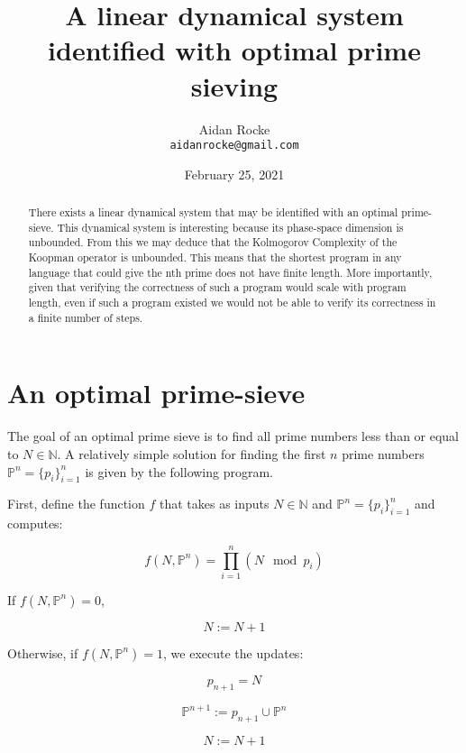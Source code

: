 \documentclass{article}
\title{A linear dynamical system identified with optimal prime sieving}
\date{February 25, 2021}
\author{%
  Aidan Rocke\\
  \texttt{aidanrocke@gmail.com} \\
}
\begin{document}
\maketitle

\begin{abstract}
There exists a linear dynamical system that may be identified with an optimal prime-sieve. This
dynamical system is interesting because its phase-space dimension is unbounded. From this we may deduce that the
Kolmogorov Complexity of the Koopman operator is unbounded. This means that the shortest program in any language
that could give the nth prime does not have finite length. More importantly, given that verifying the correctness of such a program would scale with program length, even if such a program existed we would not be able to verify its correctness in a finite number of steps.
	
\end{abstract}

\section{An optimal prime-sieve}

The goal of an optimal prime sieve is to find all prime numbers less than or equal to $N \in \mathbb{N}$.
A relatively simple solution for finding the first $n$ prime numbers $\mathbb{P}^n = \{p_i\}_{i=1}^n$
is given by the following program.

First, define the function $f$ that takes as inputs $N \in \mathbb{N}$ and $\mathbb{P}^n = \{p_i\}_{i=1}^n$
and computes:

\begin{equation}
f(N, \mathbb{P}^n) = \prod_{i=1}^n (N \mod p_i)
\end{equation}

If $f(N, \mathbb{P}^n) = 0$,

\begin{equation}
N:=N+1
\end{equation}

Otherwise, if $f(N, \mathbb{P}^n) = 1$, we execute the updates:

\begin{equation}
p_{n+1} = N
\end{equation}

\begin{equation}
\mathbb{P}^{n+1} := p_{n+1} \cup \mathbb{P}^n
\end{equation}

\begin{equation}
N := N+1
\end{equation}
\end{document}
